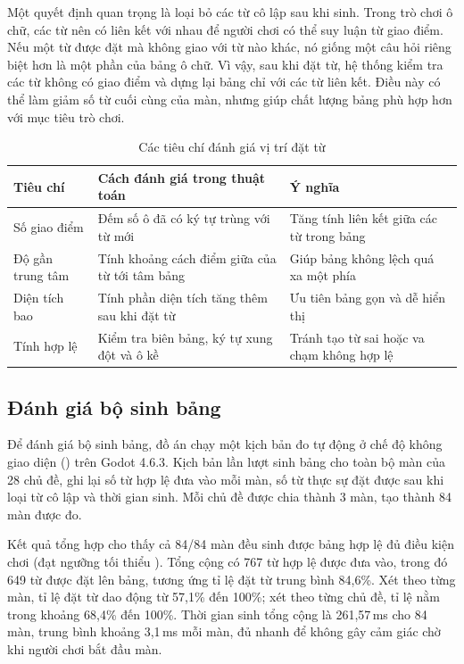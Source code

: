 \documentclass[../DoAn.tex]{subfiles}
\begin{document}
Một quyết định quan trọng là loại bỏ các từ cô lập sau khi sinh. Trong trò chơi ô chữ, các từ nên có liên kết với nhau để người chơi có thể suy luận từ giao điểm. Nếu một từ được đặt mà không giao với từ nào khác, nó giống một câu hỏi riêng biệt hơn là một phần của bảng ô chữ. Vì vậy, sau khi đặt từ, hệ thống kiểm tra các từ không có giao điểm và dựng lại bảng chỉ với các từ liên kết. Điều này có thể làm giảm số từ cuối cùng của màn, nhưng giúp chất lượng bảng phù hợp hơn với mục tiêu trò chơi.

\begin{table}[H]
\centering
\begin{tabularx}{\textwidth}{|>{\RaggedRight\arraybackslash}p{3.3cm}|>{\RaggedRight\arraybackslash}X|>{\RaggedRight\arraybackslash}X|}
\hline
\textbf{Tiêu chí} & \textbf{Cách đánh giá trong thuật toán} & \textbf{Ý nghĩa} \\ \hline
Số giao điểm & Đếm số ô đã có ký tự trùng với từ mới & Tăng tính liên kết giữa các từ trong bảng \\ \hline
Độ gần trung tâm & Tính khoảng cách điểm giữa của từ tới tâm bảng & Giúp bảng không lệch quá xa một phía \\ \hline
Diện tích bao & Tính phần diện tích tăng thêm sau khi đặt từ & Ưu tiên bảng gọn và dễ hiển thị \\ \hline
Tính hợp lệ & Kiểm tra biên bảng, ký tự xung đột và ô kề & Tránh tạo từ sai hoặc va chạm không hợp lệ \\ \hline
\end{tabularx}
\caption{Các tiêu chí đánh giá vị trí đặt từ}
\label{table:placement_scoring}
\end{table}

\subsection{Đánh giá bộ sinh bảng}
\label{subsection:5.2.1}
Để đánh giá bộ sinh bảng, đồ án chạy một kịch bản đo tự động ở chế độ không giao diện () trên Godot 4.6.3. Kịch bản lần lượt sinh bảng cho toàn bộ màn của 28 chủ đề, ghi lại số từ hợp lệ đưa vào mỗi màn, số từ thực sự đặt được sau khi loại từ cô lập và thời gian sinh. Mỗi chủ đề được chia thành 3 màn, tạo thành 84 màn được đo.

Kết quả tổng hợp cho thấy cả 84/84 màn đều sinh được bảng hợp lệ đủ điều kiện chơi (đạt ngưỡng tối thiểu ). Tổng cộng có 767 từ hợp lệ được đưa vào, trong đó 649 từ được đặt lên bảng, tương ứng tỉ lệ đặt từ trung bình 84,6\%. Xét theo từng màn, tỉ lệ đặt từ dao động từ 57,1\% đến 100\%; xét theo từng chủ đề, tỉ lệ nằm trong khoảng 68,4\% đến 100\%. Thời gian sinh tổng cộng là 261,57\,ms cho 84 màn, trung bình khoảng 3,1\,ms mỗi màn, đủ nhanh để không gây cảm giác chờ khi người chơi bắt đầu màn.
\end{document}
